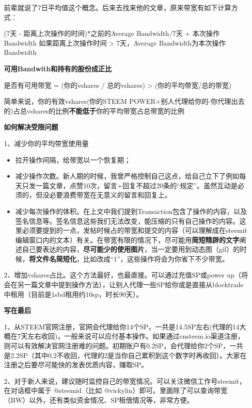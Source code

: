 \documentclass[]{ctexbook}
\begin{document}
前辈就说了7日平均值这个概念。后来去找来他的文章，原来带宽有如下计算方式：

(7天 - 距离上次操作的时间)*之前的Average Bandwidth/7天 + 本次操作Bandwidth
如果距离上次操作时间 \textgreater{} 7天，Average Bandwidth为本次操作Bandwidth

\textbf{可用Bandwith和持有的股份成正比}

是否有可用带宽 = (你的vshares / 总的vshares) \textgreater{} (你的平均带宽/总的带宽)

简单来说，你的有效vshares(你的STEEM POWER+别人代理给你的-你代理出去的)占总vshares的比例\textbf{不能低于}你的平均带宽占总带宽的比例

\textbf{如何解决受限问题}

1、减少你的平均带宽使用量

\begin{itemize}
\item
  拉开操作间隔，给带宽以一个恢复期；
\item
  减少操作次数。新人期的时候，我曾严格控制自己这点，给自己立下了例如每天只发一篇文章，点赞10次，留言+回复不超过20条的``规定''。虽然互动是必须的，但没必要浪费带宽在无意义的留言和回复上。
\item
  减少每次操作的体积。在上文中我们提到Transaction包含了操作的内容，以及签名信息等。签名信息这些我们无法改变，能压缩的只有自己操作的内容。这里必须要提到的一点，发帖时候占的带宽和提交的内容（可以理解成在steemit编辑窗口内的文本）有关。在带宽有限的情况下，尽可能用\textbf{简短精辟的文字}阐述自己要表达的内容，\textbf{尽可能少的使用图片}，当一定要用到动态图（gif）的时候，\textbf{将文件名简短化}，比如改成``1''，这些操作将会为你省下不少带宽。
\end{itemize}

2、增加vshares占比。这个方法最好，也最直接。可以通过充值SP或power up（将会在另一篇文章中提到操作方法），让别人代理一些SP给你或是直接从blocktrade中租用（目前是1sbd租用约10sp，时长90天）。

\textbf{写在最后}

1、从STEEM官网注册，官网会代理给你14个SP，一共是14.5SP左右(代理的14大概在7天左右收回)，一般来说可以应付基本操作。如果通过cnsteem.io渠道注册，则可以有效解决官网注册难的问题。初期账户有0.2SP，会代理给你2个SP，一共是2.2SP（其中0.2不收回，代理的2是当你自己累积到这个数字时再收回）。大家在注册之后要尽可能快的发表优质内容，赚取SP。

2、对于新人来说，建议随时监控自己的带宽情况。可以关注微信工作号steemit，在对话框中属于 @steemid（比如 @vickylin）即可。里面除了可以查询带宽（BW）以外，还有类似资金情况、SP租借情况等，非常方便。
\end{document}
